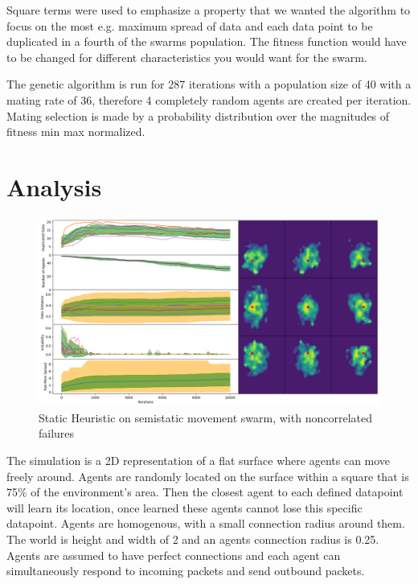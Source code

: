 \documentclass{UoYCSproject}
\begin{document}
Square terms were used to emphasize a property that we wanted the algorithm to focus on the most e.g. maximum spread of data and each data point to be duplicated in a fourth of the swarms population. The fitness function would have to be changed for different characteristics you would want for the swarm.

The genetic algorithm is run for 287 iterations with a population size of 40 with a mating rate of 36, therefore 4 completely random agents are created per iteration. Mating selection is made by a probability distribution over the magnitudes of fitness min max normalized.


\chapter{Analysis}
\label{cha:Analysis}

\begin{figure}[htb]
\label{fig:static_movement_non}
\begin{center}
\centering
\includegraphics[width=\linewidth]{"./Static_Heuristic/Static_Movement_non.png"}
\caption{Static Heuristic on semi\-static movement swarm, with non\-correlated failures}
\end{center}
\end{figure}

The simulation is a 2D representation of a flat surface where agents can move freely around.
Agents are randomly located on the surface within a square that is 75\% of the environment's area.
Then the closest agent to each defined datapoint will learn its location, once learned these agents cannot lose this specific datapoint.
Agents are homogenous, with a small connection radius around them.
The world is height and width of 2 and an agents connection radius is 0.25.
Agents are assumed to have perfect connections and each agent can simultaneously respond to incoming packets and send outbound packets.
\end{document}

